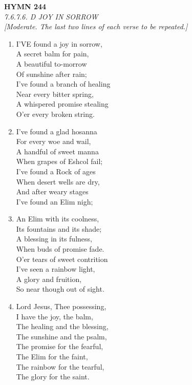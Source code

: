 \newpage
\begin{center}
    {\Large \textbf{HYMN 244}}
    \\
    \textit{7.6.7.6. D JOY IN SORROW}
    \\
    \textit{\small [Moderate. The last two lines of each verse to be repeated.]}
\end{center}
\vspace{1em}

\begin{enumerate}
    \item I'VE found a joy in sorrow, \\
            A secret balm for pain, \\
        A beautiful to-morrow \\
            Of sunshine after rain; \\
        I've found a branch of healing \\
            Near every bitter spring, \\
        A whispered promise stealing \\
            O'er every broken string.

    \item I've found a glad hosanna \\
            For every woe and wail, \\
        A handful of sweet manna \\
            When grapes of Eshcol fail; \\
        I've found a Rock of ages \\
            When desert wells are dry, \\
        And after weary stages \\
            I've found an Elim nigh;

    \item An Elim with its coolness, \\
            Its fountains and its shade; \\
        A blessing in its fulness, \\
            When buds of promise fade. \\
        O'er tears of sweet contrition \\
            I've seen a rainbow light, \\
        A glory and fruition, \\
            So near though out of sight.

    \item Lord Jesus, Thee possessing, \\
            I have the joy, the balm, \\
        The healing and the blessing, \\
            The sunshine and the psalm, \\
        The promise for the fearful, \\
            The Elim for the faint, \\
        The rainbow for the tearful, \\
            The glory for the saint.

\end{enumerate}

